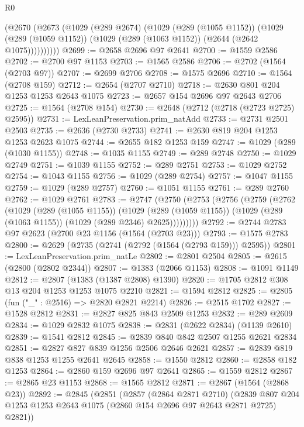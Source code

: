\begin{lexlean}{R0}
\begin{coremodule}
        (@2670
          (@2673
            (@1029
              (@289 @2674)
              (@1029
                (@289 (@1055 @1152))
                (@1029
                  (@289 (@1059 @1152))
                  (@1029 (@289 (@1063 @1152)) (@2644 (@2642 @1075))))))))))
@2699 := @2658 @2696 @97 @2641
@2700 := @1559 @2586
@2702 := @2700 @97 @1153
@2703 := @1565 @2586
@2706 := @2702 (@1564 (@2703 @97))
@2707 := @2699 @2706
@2708 := @1575 @2696
@2710 := @1564 (@2708 @159)
@2712 := @2654 (@2707 @2710)
@2718 := @2630 @801 @204 @1253 @1253 @2643 @1075
@2723 := @2657 @154 @2696 @97 @2643 @2706
@2725 := @1564 (@2708 @154)
@2730 := @2648 (@2712 (@2718 (@2723 @2725) @2595))
@2731 := LexLeanPreservation.prim_natAdd
@2733 := @2731 @2501 @2503
@2735 := @2636 (@2730 @2733)
@2741 := @2630 @819 @204 @1253 @1253 @2623 @1075
@2744 := @2655 @182 @1253 @159
@2747 := @1029 (@289 (@1030 @1155))
@2748 := @1035 @1155
@2749 := @289 @2748
@2750 := @1029 @2749
@2751 := @1039 @1155
@2752 := @289 @2751
@2753 := @1029 @2752
@2754 := @1043 @1155
@2756 := @1029 (@289 @2754)
@2757 := @1047 @1155
@2759 := @1029 (@289 @2757)
@2760 := @1051 @1155
@2761 := @289 @2760
@2762 := @1029 @2761
@2783 := @2747
    (@2750
      (@2753
        (@2756
          (@2759
            (@2762
              (@1029
                (@289 (@1055 @1155))
                (@1029
                  (@289 (@1059 @1155))
                  (@1029 (@289 (@1063 @1155)) (@1029 (@289 @2346) @2625)))))))))
@2792 := @2744 @2783 @97 @2623 (@2700 @23 @1156 (@1564 (@2703 @23)))
@2793 := @1575 @2783
@2800 := @2629 (@2735 (@2741 (@2792 (@1564 (@2793 @159))) @2595))
@2801 := LexLeanPreservation.prim_natLe
@2802 := @2801 @2504
@2805 := @2615 (@2800 (@2802 @2344))
@2807 := @1383 (@2066 @1153)
@2808 := @1091 @1149
@2812 := @2807 (@1383 (@1387 @2808) @1390)
@2820 := @1705 @2812 @308 @13 @204 @1253 @1253 @1075 @2210
@2821 := @1594 @2812
@2825 := @2805 (fun ("_" : @2516) => @2820 @2821 @2214)
@2826 := @2515 @1702
@2827 := @1528 @2812
@2831 := @2827 @825 @843 @2509 @1253
@2832 := @289 @2609
@2834 := @1029 @2832 @1075
@2838 := @2831 (@2622 @2834) (@1139 @2610)
@2839 := @1541 @2812
@2845 := @2839 @840 @842 @2507 @1255 @2621 @2834
@2851 := @2827 @827 @839 @1256 @2506 @2646 @2621
@2857 := @2839 @819 @838 @1253 @1255 @2641 @2645
@2858 := @1550 @2812
@2860 := @2858 @182 @1253
@2864 := @2860 @159 @2696 @97 @2641
@2865 := @1559 @2812
@2867 := @2865 @23 @1153
@2868 := @1565 @2812
@2871 := @2867 (@1564 (@2868 @23))
@2892 := @2845
    (@2851
      (@2857
        (@2864 @2871 @2710)
        (@2839 @807 @204 @1253 @1253 @2643 @1075 (@2860 @154 @2696 @97 @2643 @2871 @2725) @2821))

\end{coremodule}
\end{lexlean}

